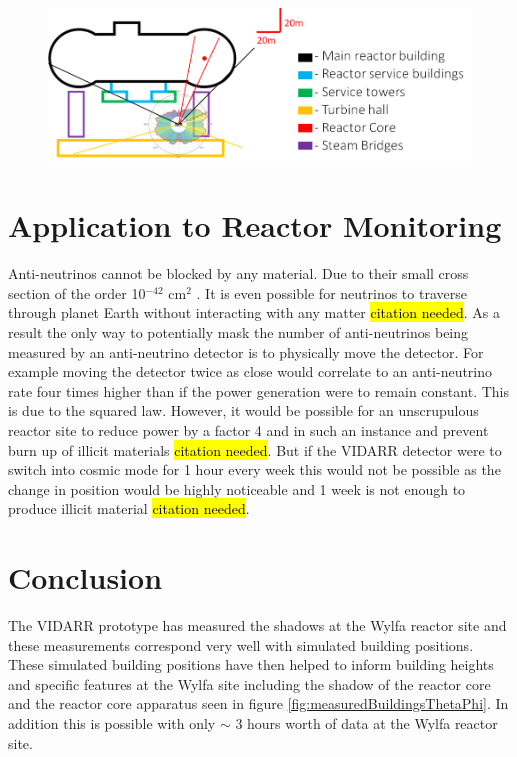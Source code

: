 \documentclass[12pt,a4paper]{article}
\begin{document}
\begin{figure}[H]
 \centering
 \includegraphics[width=1.0\linewidth]{wylfaReactorBuildings/wylfaTrace+overlay+key.png}
 \label{fig:wylfaTraceOfBuildings+overlay}
\end{figure}

\section{Application to Reactor Monitoring} \label{sec:ApplicationToReactorMonitoring}
Anti-neutrinos cannot be blocked by any material. Due to their small cross section of the order 10$^{-42}$ cm$^2$ \cite{Vogel_1999}. It is even possible for neutrinos to traverse through planet Earth without interacting with any matter \hl{citation needed}. As a result the only way to potentially mask the number of anti-neutrinos being measured by an anti-neutrino detector is to physically move the detector. For example moving the detector twice as close would correlate to an anti-neutrino rate four times higher than if the power generation were to remain constant. This is due to the squared law. However, it would be possible for an unscrupulous reactor site to reduce power by a factor 4 and in such an instance and prevent burn up of illicit materials \hl{citation needed}. But if the VIDARR detector were to switch into cosmic mode for 1 hour every week this would not be possible as the change in position would be highly noticeable and 1 week is not enough to produce illicit material \hl{citation needed}. 

\section{Conclusion} \label{sec:Conclusion}
 The VIDARR prototype has measured the shadows at the Wylfa reactor site and these measurements correspond very well with simulated building positions. These simulated building positions have then helped to inform building heights and specific features at the Wylfa site including the shadow of the reactor core and the reactor core apparatus seen in figure \ref{fig:measuredBuildingsThetaPhi}. In addition this is possible with only $\sim$ 3 hours worth of data at the Wylfa reactor site.
\end{document}
